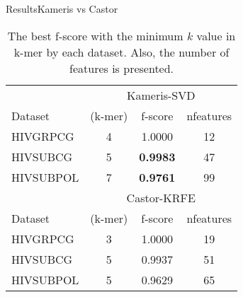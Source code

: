\documentclass[10pt]{beamer}
\newcommand{\1}{
        	\setbeamertemplate{background}{
        		\texttt{[image: img/1]}
        		\tikz[overlay] \fill[fill opacity=0.75,fill=white] (0,0) rectangle (-\paperwidth,\paperheight);
        	}
}
\begin{document}
\begin{frame}{Results}{Kameris vs Castor}

\begin{table}[h]
	\begin{center}		
		\caption{The best f-score with the minimum $k$ value in k-mer by each dataset. Also, the number of features is presented.}
		\label{tab:results}
		\begin{tabular}{lccc}
			\hline			
			&	\multicolumn{3}{c}{Kameris-SVD}		       \\
			Dataset	&	(k-mer) 	& f-score     & nfeatures    \\				
			\hline
			
			HIVGRPCG  & 4 & 1.0000    & 12     \\
			HIVSUBCG  & 5 & \textbf{0.9983} & 47     \\
			HIVSUBPOL & 7 & \textbf{0.9761} & 99     \\
			
			& \multicolumn{3}{c}{Castor-KRFE}      \\
			Dataset	&	(k-mer) 	& f-score     & nfeatures    \\				
			\hline
			HIVGRPCG      & 3        & 1.0000   &   19 \\
			HIVSUBCG      & 5        & 0.9937   &   51 \\
			HIVSUBPOL     & 5        & 0.9629   &   65 \\
			
			\hline
		\end{tabular}		
		
	\end{center}
\end{table}
	
\end{frame}
\end{document}
